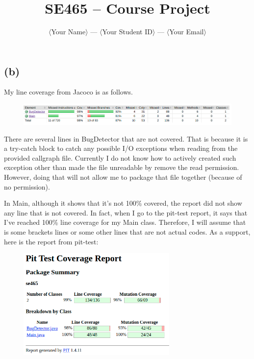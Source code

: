 \documentclass[12pt]{article}
\title{SE465 -- Course Project}
\author{$\langle$Your Name$\rangle$ --- $\langle$Your Student ID$\rangle$ --- $\langle$Your Email$\rangle$}
\date{}
\begin{document}
\maketitle
\subsection*{(b)}

My line coverage from Jacoco is as follows.
\begin{figure}[H] %
\centering %
\includegraphics[width=1\textwidth]{jacoco-coverage.png} %
\end{figure}

There are several lines in BugDetector that are not covered. That is because it is a try-catch block to catch any possible I/O exceptions when reading from the provided callgraph file. Currently I do not know how to actively created such exception other than made the file unreadable by remove the read permission. However, doing that will not allow me to package that file together (because of no permission). 

In Main, although it shows that it's not 100\% covered, the report did not show any line that is not covered. In fact, when I go to the pit-test report, it says that I've reached 100\% line coverage for my Main class. Therefore, I will assume that is some brackets lines or some other lines that are not actual codes. As a support, here is the report from pit-test:

\begin{figure}[H] %
\centering %
\includegraphics[width=0.7\textwidth]{pittest-coverage.png} %
\end{figure}
\end{document}

